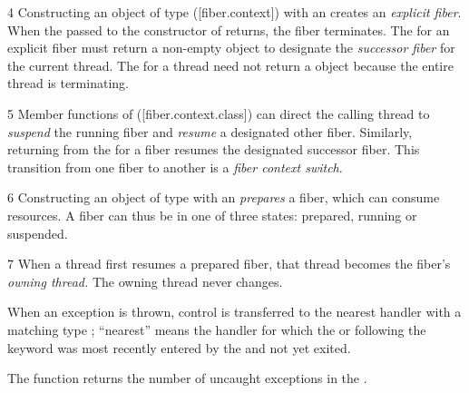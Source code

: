 4 Constructing an object of type \stdfiber ([fiber.context]) with an \entryfn
creates an \emph{explicit fiber}. When the \entryfn passed to the constructor
of \fiber returns, the fiber terminates. The \entryfn for an explicit
fiber must return a non-empty \fiber object to designate the \emph{successor
fiber} for the current thread. The \entryfn for a thread need not return
a \fiber object because the entire thread is terminating.

5 Member functions of \fiber ([fiber.context.class]) can direct the calling
thread to \emph{suspend} the running fiber and \emph{resume} a designated
other fiber. Similarly, returning from the \entryfn for a fiber resumes
the designated successor fiber. This transition from one fiber to another is
a \emph{fiber context switch}.

6 Constructing an object of type \fiber with an \entryfn \emph{prepares} a
fiber, which can consume resources. A fiber can thus be in one of three
states: prepared, running or suspended.

7 When a thread first resumes a prepared fiber, that thread becomes the
fiber's \emph{owning thread.} The owning thread never changes.
\cbend


When an exception is thrown, control is transferred to the nearest handler
with a matching type ; ``nearest'' means the handler for
which the  or
 following the  keyword was
most recently entered by the  and
not yet exited.




The function 
returns the number of uncaught exceptions in the
.

